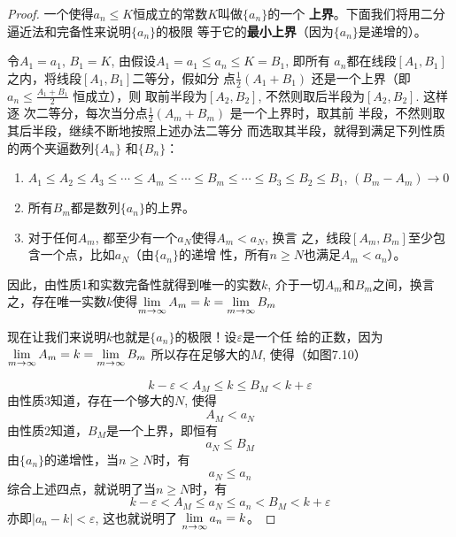 \begin{proof}
    一个使得$a_n\le K$恒成立的常数$K$叫做$\{a_n\}$的一个
\textbf{上界}。下面我们将用二分逼近法和完备性来说明$\{a_n\}$的极限
等于它的\textbf{最小上界}（因为$\{a_n\}$是递增的）。

令$A_1=a_1$, $B_1=K$, 由假设$A_1=a_1\le a_n\le K=B_1$, 即所有
$a_n$都在线段$[A_1,B_1]$之内，将线段$[A_1,B_1]$二等分，假如分
点$\frac{1}{2}(A_1+B_1)$
还是一个上界（即$a_n\le \frac{A_1+B_1}{2}$
恒成立），则
取前半段为$[A_2,B_2]$, 不然则取后半段为$[A_2,B_2]$. 这样逐
次二等分，每次当分点$\frac{1}{2}(A_m+B_m)$
是一个上界时，取其前
半段，不然则取其后半段，继续不断地按照上述办法二等分
而选取其半段，就得到满足下列性质的两个夹逼数列$\{A_n\}$
和$\{B_n\}$：

\begin{enumerate}
    \item $A_1\le A_2\le A_3\le \cdots \le A_m\le \cdots \le B_m\le \cdots\le B_3\le B_2\le B_1$, $(B_m-A_m)\to 0$
    \item 所有$B_m$都是数列$\{a_n\}$的上界。
    \item 对于任何$A_m$, 都至少有一个$a_N$使得$A_m<a_N$, 换言
之，线段$[A_m,B_m]$至少包含一个点，比如$a_N$（由$\{a_n\}$的递增
性，所有$n\ge N$也满足$A_m<a_n$）。
\end{enumerate}

因此，由性质1和实数完备性就得到唯一的实数$k$, 
介于一切$A_m$和$B_m$之间，换言之，存在唯一实数$k$使得$\displaystyle\lim_{m\to\infty}A_m=k=\displaystyle\lim_{m\to\infty}B_m$

现在让我们来说明$k$也就是$\{a_n\}$的极限！设$\varepsilon$是一个任
给的正数，因为$\displaystyle\lim_{m\to\infty}A_m=k=\displaystyle\lim_{m\to\infty}B_m$
所以存在足够大的$M$, 使得（如图7.10）
\begin{figure}[htp]
    \centering

    \caption{}
\end{figure}
\begin{equation}
    k-\varepsilon<A_M\le k\le B_M<k+\varepsilon
\end{equation}
由性质3知道，存在一个够大的$N$, 使得
\begin{equation}
    A_M<a_N    
\end{equation}
由性质2知道，$B_M$是一个上界，即恒有
\begin{equation}
    a_N\le B_M
\end{equation} 
由$\{a_n\}$的递增性，当$n\ge N$时，有
\begin{equation}
    a_N\le a_n
\end{equation} 
综合上述四点，就说明了当$n\ge N$时，有
\[k-\varepsilon<A_M\le a_N\le a_n<B_M<k+\varepsilon\]
亦即$|a_n-k|<\varepsilon$, 这也就说明了
$\displaystyle\lim_{n\to\infty}a_n=k$。
\end{proof}


